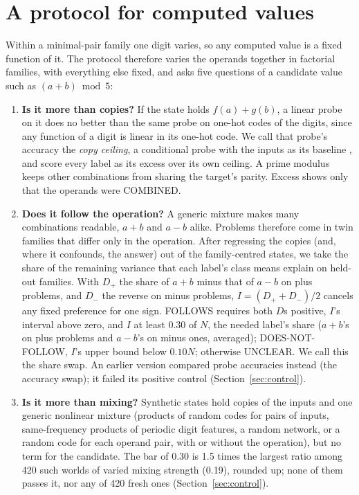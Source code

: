 \documentclass{article}
\begin{document}
\section{A protocol for computed values}\label{sec:protocol}

Within a minimal-pair family one digit varies, so any computed value is a fixed function of it. The protocol therefore varies the operands together in factorial families, with everything else fixed, and asks five questions of a candidate value such as $(a+b) \bmod 5$:
\begin{enumerate}
\item \textbf{Is it more than copies?} If the state holds $f(a)+g(b)$, a linear probe on it does no better than the same probe on one-hot codes of the digits, since any function of a digit is linear in its one-hot code. We call that probe's accuracy the \emph{copy ceiling}, a conditional probe with the inputs as its baseline \citep{hewitt2021conditional}, and score every label as its excess over its own ceiling. A prime modulus keeps other combinations from sharing the target's parity. Excess shows only that the operands were COMBINED.
\item \textbf{Does it follow the operation?} A generic mixture makes many combinations readable, $a+b$ and $a-b$ alike. Problems therefore come in twin families that differ only in the operation. After regressing the copies (and, where it confounds, the answer) out of the family-centred states, we take the share of the remaining variance that each label's class means explain on held-out families. With $D_+$ the share of $a+b$ minus that of $a-b$ on plus problems, and $D_-$ the reverse on minus problems, $I = (D_+ + D_-)/2$ cancels any fixed preference for one sign. FOLLOWS requires both $D$s positive, $I$'s interval above zero, and $I$ at least 0.30 of $N$, the needed label's share ($a+b$'s on plus problems and $a-b$'s on minus ones, averaged); DOES-NOT-FOLLOW, $I$'s upper bound below $0.10N$; otherwise UNCLEAR. We call this the share swap. An earlier version compared probe accuracies instead (the accuracy swap); it failed its positive control (Section~\ref{sec:control}).
\item \textbf{Is it more than mixing?} Synthetic states hold copies of the inputs and one generic nonlinear mixture (products of random codes for pairs of inputs, same-frequency products of periodic digit features, a random network, or a random code for each operand pair, with or without the operation), but no term for the candidate. The bar of 0.30 is 1.5 times the largest ratio among 420 such worlds of varied mixing strength (0.19), rounded up; none of them passes it, nor any of 420 fresh ones (Section~\ref{sec:control}).

\end{enumerate}
\end{document}
